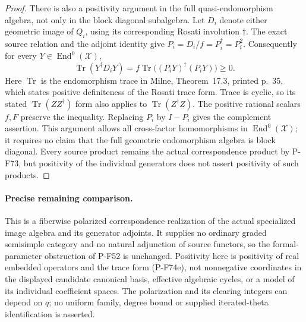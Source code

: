 \begin{proof}
There is also a positivity argument in the full
quasi-endomorphism algebra, not only in the block diagonal
subalgebra.  Let $D_i$ denote either geometric image of
$Q_i$, using its corresponding Rosati involution $\dagger$.
The exact source relation and the adjoint identity give
$P_i=D_i/f=P_i^\dagger=P_i^2$.  Consequently for every
$Y\in\operatorname{End}^0(\mathcal X)$,
\[
 \operatorname{Tr}(Y^\dagger D_iY)
       =f\operatorname{Tr}\bigl((P_iY)^\dagger(P_iY)\bigr)\ge0.
                                                               \tag{P-F74q}
\]
Here $\operatorname{Tr}$ is the endomorphism trace in Milne,
Theorem~17.3, printed p.~35, which states positive definiteness
of the Rosati trace form.  Trace is cyclic, so its stated
$\operatorname{Tr}(ZZ^\dagger)$ form also applies to
$\operatorname{Tr}(Z^\dagger Z)$.  The positive rational
scalars $f,F$ preserve the inequality.  Replacing $P_i$ by
$I-P_i$ gives the complement assertion.  This argument
allows all cross-factor homomorphisms in
$\operatorname{End}^0(\mathcal X)$; it requires no claim
that the full geometric endomorphism algebra is block
diagonal.  Every source product remains the actual
correspondence product by P-F73, but positivity of the
individual generators does not assert positivity of such
products.
\end{proof}

\paragraph{Precise remaining comparison.}
This is a fiberwise polarized correspondence realization
of the actual specialized image algebra and its
generator adjoints.  It supplies no ordinary graded
semisimple category and no natural adjunction of source
functors, so the formal-parameter obstruction of P-F52
is unchanged.  Positivity here is positivity of real
embedded operators and the trace form (P-F74e), not
nonnegative coordinates in the displayed candidate
canonical basis, effective algebraic cycles, or a model
of its individual coefficient spaces.  The polarization
and its clearing integers can depend on $q$; no uniform
family, degree bound or supplied iterated-theta
identification is asserted.
